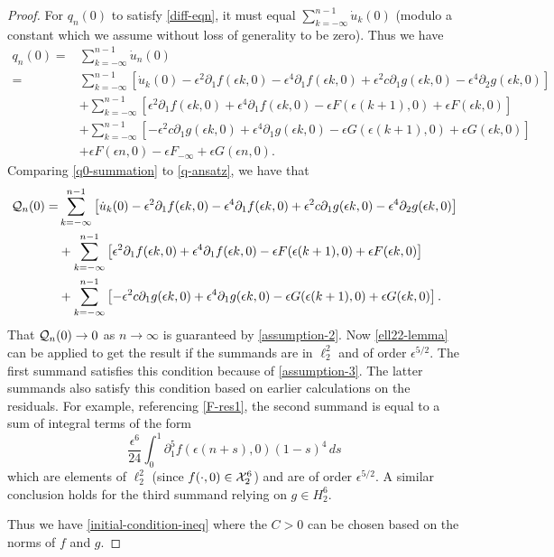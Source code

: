 \begin{proof}
	For \(q_n(0)\) to satisfy \cref{diff-eqn}, it must equal \(\sum_{k=-\infty}^{n-1} \dot u_k(0)\) (modulo a constant which we assume without loss of generality to be zero). Thus we have
	\begin{equation}\label{q0-summation}
	\begin{aligned}	
		q_n(0) =& \sum_{k=-\infty}^{n-1} \dot u_n(0)\\
		=& \sum_{k=-\infty}^{n-1}\left[ \dot u_k(0) - \epsilon^2 \partial_1 f(\epsilon k,0) - \epsilon^4 \partial_1 f(\epsilon k,0) + \epsilon^2 c \partial_1 g(\epsilon k,0) - \epsilon^4 \partial_2g(\epsilon k,0)\right] \\
		&+\sum_{k=-\infty}^{n-1}\left[  \epsilon^2 \partial_1 f(\epsilon k,0) +\epsilon^4 \partial_1 f(\epsilon k,0) - \epsilon F(\epsilon(k+1),0) +\epsilon F(\epsilon k ,0)  \right] \\
		&+ \sum_{k=-\infty}^{n-1}\left[ - \epsilon^2 c\partial_1 g(\epsilon k,0) +\epsilon^4 \partial_1 g(\epsilon k,0) - \epsilon G(\epsilon(k+1),0) +\epsilon G(\epsilon k ,0)  \right] \\
		&+ \epsilon F(\epsilon n, 0) - \epsilon F_{-\infty} + \epsilon G(\epsilon n, 0).
	\end{aligned}
	\end{equation}
	Comparing \cref{q0-summation} to \cref{q-ansatz}, we have that 
	 \begin{equation}\label{mcq-zero}
	 \begin{aligned}
		\mathcal{Q}_n(0) =& \sum_{k=-\infty}^{n-1}\left[ \dot u_k(0) - \epsilon^2 \partial_1 f(\epsilon k,0) - \epsilon^4 \partial_1 f(\epsilon k,0) + \epsilon^2 c \partial_1 g(\epsilon k,0) - \epsilon^4 \partial_2g(\epsilon k,0)\right] \\
		&+\sum_{k=-\infty}^{n-1}\left[  \epsilon^2 \partial_1 f(\epsilon k,0) +\epsilon^4 \partial_1 f(\epsilon k,0) - \epsilon F(\epsilon(k+1),0) +\epsilon F(\epsilon k ,0)  \right] \\
		&+ \sum_{k=-\infty}^{n-1}\left[ - \epsilon^2 c\partial_1 g(\epsilon k,0) +\epsilon^4 \partial_1 g(\epsilon k,0) - \epsilon G(\epsilon(k+1),0) +\epsilon G(\epsilon k ,0)  \right].
	\end{aligned}
	\end{equation}
	That \(\mathcal{Q}_n(0)\to 0\) as \(n\to\infty\) is guaranteed by \cref{assumption-2}. Now \cref{ell22-lemma} can be applied to get the result if the summands are in \(\ell^2_2\) and of order \(\epsilon^{5/2}\). The first summand satisfies this condition because of \cref{assumption-3}. The latter summands also satisfy this condition based on earlier calculations on the residuals. For example, referencing \cref{F-res1}, the second summand is equal to a sum of integral terms of the form
	\begin{equation}
		\frac{\epsilon^6}{24} \int_0^1 \partial_1^5 f(\epsilon(n+s), 0)(1-s)^4\, ds
	\end{equation}
	which are elements of \(\ell^2_2\) (since \(f(\cdot, 0) \in \mathcal{X}_2^6\)) and are of order \(\epsilon^{5/2}\). A similar conclusion holds for the third summand relying on \(g\in H^6_2\).
	
	Thus we have \cref{initial-condition-ineq} where the \(C>0\) can be chosen based on the norms of \(f\) and \(g\).
\end{proof}
